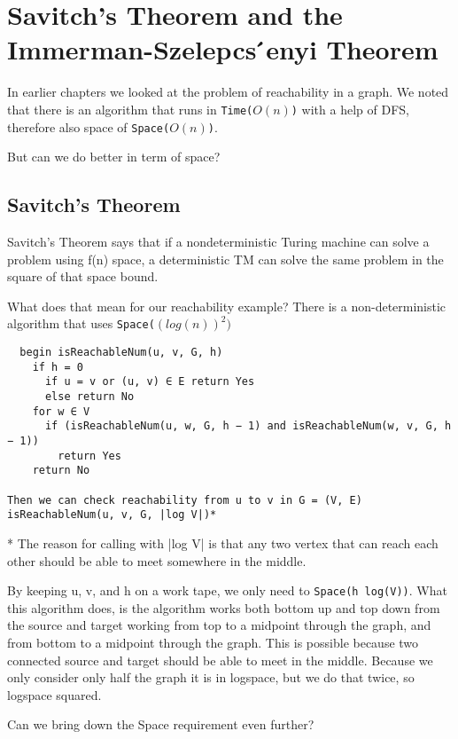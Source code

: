 \section{Savitch’s Theorem and the Immerman-Szelepcs ́enyi Theorem}

In earlier chapters we looked at the problem of reachability in a graph.
We noted that there is an algorithm that runs in \texttt{Time($O({n})$)} with a help of DFS, 
therefore also space of \texttt{Space($O({n})$)}.


But can we do better in term of space? 
\subsection{Savitch’s Theorem}
Savitch’s Theorem says that if a nondeterministic Turing machine can solve a problem using f(n) space,
a deterministic TM can solve the same problem in the square of that space bound. 

What does that mean for our reachability example?
There is a non-deterministic algorithm that uses \texttt{Space($(log(n))^2)$}

\begin{verbatim}
  begin isReachableNum(u, v, G, h)
    if h = 0
      if u = v or (u, v) ∈ E return Yes
      else return No 
    for w ∈ V
      if (isReachableNum(u, w, G, h − 1) and isReachableNum(w, v, G, h − 1)) 
        return Yes
    return No

Then we can check reachability from u to v in G = (V, E)
isReachableNum(u, v, G, |log V|)*
\end{verbatim}
* The reason for calling with |log V| is that any two vertex that can reach each other should be able to meet somewhere in the middle.

By keeping u, v, and h on a work tape, we only need to \texttt{Space(h log(V))}. 
What this algorithm does, is the algorithm works both bottom up and top down from the source and target 
working from top to a midpoint through the graph, and from bottom to a midpoint through the graph. 
This is possible because two connected source and target should be able to meet in the middle.
Because we only consider only half the graph it is in logspace, but we do that twice, so logspace squared.


Can we bring down the Space requirement even further?

